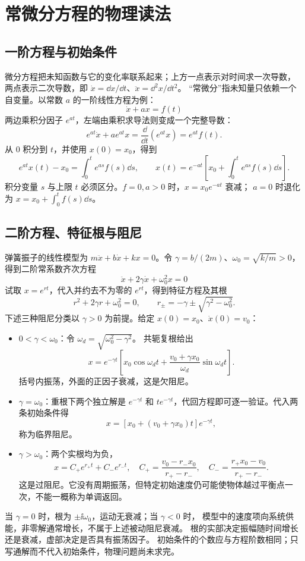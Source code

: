 \section{常微分方程的物理读法}

\subsection{一阶方程与初始条件}
微分方程把未知函数与它的变化率联系起来；上方一点表示对时间求一次导数，
两点表示二次导数，即 $\dot x=\dd x/\dd t$、$\ddot x=\dd^2x/\dd t^2$。
“常微分”指未知量只依赖一个自变量。以常数 $a$ 的一阶线性方程为例：
\begin{equation}
 \dot x+ax=f(t)
\end{equation}
两边乘积分因子 $e^{at}$，左端由乘积求导法则变成一个完整导数：
\[
 e^{at}\dot x+ae^{at}x=\frac{\dd}{\dd t}(e^{at}x)=e^{at}f(t).
\]
从 $0$ 积分到 $t$，并使用 $x(0)=x_0$，得到
\[
 e^{at}x(t)-x_0=\int_0^t e^{as}f(s)\dd s,\qquad
 \boxed{x(t)=e^{-at}\left[x_0+\int_0^t e^{as}f(s)\dd s\right]}.
\]
积分变量 $s$ 与上限 $t$ 必须区分。$f=0,a>0$ 时，$x=x_0e^{-at}$ 衰减；
$a=0$ 时退化为 $x=x_0+\int_0^t f(s)\dd s$。

\subsection{二阶方程、特征根与阻尼}
弹簧振子的线性模型为 $m\ddot x+b\dot x+kx=0$。令
$\gamma=b/(2m)$、$\omega_0=\sqrt{k/m}>0$，得到二阶常系数齐次方程
\begin{equation}
 \ddot x+2\gamma\dot x+\omega_0^2x=0
\end{equation}
试取 $x=e^{rt}$，代入并约去不为零的 $e^{rt}$，得到特征方程及其根
\[
 r^2+2\gamma r+\omega_0^2=0,\qquad r_\pm=-\gamma\pm\sqrt{\gamma^2-\omega_0^2}.
\]
下述三种阻尼分类以 $\gamma>0$ 为前提。给定 $x(0)=x_0$、$\dot x(0)=v_0$：
\begin{itemize}
 \item $0<\gamma<\omega_0$：令 $\omega_d=\sqrt{\omega_0^2-\gamma^2}$。
 共轭复根给出
 \[
 x=e^{-\gamma t}\left[x_0\cos\omega_dt+
 \frac{v_0+\gamma x_0}{\omega_d}\sin\omega_dt\right].
 \]
 括号内振荡，外面的正因子衰减，这是欠阻尼。
 \item $\gamma=\omega_0$：重根下两个独立解是 $e^{-\gamma t}$ 和
 $te^{-\gamma t}$，代回方程即可逐一验证。代入两条初始条件得
 \[
 x=[x_0+(v_0+\gamma x_0)t]e^{-\gamma t},
 \]
 称为临界阻尼。
 \item $\gamma>\omega_0$：两个实根均为负，
 \[
 x=C_+e^{r_+t}+C_-e^{r_-t},\quad
 C_+=\frac{v_0-r_-x_0}{r_+-r_-},\quad
 C_-=\frac{r_+x_0-v_0}{r_+-r_-}.
 \]
 这是过阻尼。它没有周期振荡，但特定初始速度仍可能使物体越过平衡点一次，不能一概称为单调返回。
\end{itemize}
当 $\gamma=0$ 时，根为 $\pm\ii\omega_0$，运动无衰减；当 $\gamma<0$ 时，
模型中的速度项向系统供能，非零解通常增长，不属于上述被动阻尼衰减。
根的实部决定振幅随时间增长还是衰减，虚部决定是否具有振荡因子。
初始条件的个数应与方程阶数相同；只写通解而不代入初始条件，物理问题尚未求完。

